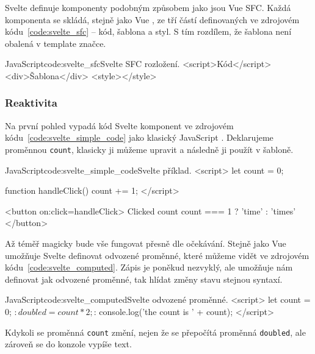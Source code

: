 \documentclass[
  master,
  program=ainf,
  tables=false,
  sourcecodes,
  glossaries,
  index
]{kidiplom}
\begin{document}
Svelte \cite{svelte} definuje komponenty podobným způsobem jako jsou Vue SFC. Každá komponenta se skládá,
stejně jako Vue \cite{vue}, ze tří částí definovaných ve zdrojovém kódu~\ref{code:svelte_sfc} -- kód, šablona a styl.
S tím rozdílem, že šablona není obalená v template značce.

\begin{absolutelynopagebreak}
\begin{kicode}{JavaScript}{code:svelte_sfc}{Svelte SFC rozložení.}
  <script>Kód</script>
  <div>Šablona</div>
  <style></style>
\end{kicode}
\end{absolutelynopagebreak}

\subsubsection{Reaktivita}

Na první pohled vypadá kód Svelte komponent ve zdrojovém kódu~\ref{code:svelte_simple_code} jako klasický JavaScript \cite{js}. Deklarujeme proměnnou {\tt count},
klasicky ji můžeme upravit a následně ji použít v šabloně.

\begin{kicode}{JavaScript}{code:svelte_simple_code}{Svelte příklad.}
  <script>
    let count = 0;

    function handleClick() {
      count += 1;
    }
  </script>

  <button on:click={handleClick}>
    Clicked {count} {count === 1 ? 'time' : 'times'}
  </button>
\end{kicode}

Až téměř magicky bude vše fungovat přesně dle očekávání. Stejně jako Vue \cite{vue} umožňuje Svelte \cite{svelte} definovat
odvozené proměnné, které můžeme vidět ve zdrojovém kódu~\ref{code:svelte_computed}. Zápis je poněkud nezvyklý, ale umožňuje nám definovat jak odvozené proměnné, tak
hlídat změny stavu stejnou syntaxí. 

  \begin{kicode}{JavaScript}{code:svelte_computed}{Svelte odvozené proměnné.}
    <script>
      let count = 0;
      $: doubled = count * 2;

      $: {
        console.log('the count is ' + count);
      }
    </script>
  \end{kicode}

Kdykoli se proměnná {\tt count} změní, nejen že se přepočítá proměnná {\tt doubled}, ale zároveň se do konzole
vypíše text.
\end{document}
